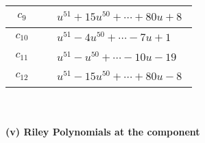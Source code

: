 \documentclass[1p]{elsarticle_modified}
\theoremstyle{definition}
\begin{document}
\begin{tabular}{m{50pt}|m{274pt}}
\hline $$\begin{aligned}c_{9}\end{aligned}$$&$\begin{aligned}
&u^{51}+15 u^{50}+\cdots+80 u+8
\end{aligned}$\\
\hline $$\begin{aligned}c_{10}\end{aligned}$$&$\begin{aligned}
&u^{51}-4 u^{50}+\cdots-7 u+1
\end{aligned}$\\
\hline $$\begin{aligned}c_{11}\end{aligned}$$&$\begin{aligned}
&u^{51}- u^{50}+\cdots-10 u-19
\end{aligned}$\\
\hline $$\begin{aligned}c_{12}\end{aligned}$$&$\begin{aligned}
&u^{51}-15 u^{50}+\cdots+80 u-8
\end{aligned}$\\
\hline
\end{tabular}\\~\\
\newpage\renewcommand{\arraystretch}{1}
\flushleft \textbf{(v) Riley Polynomials at the component}\newline \\
\end{document}
